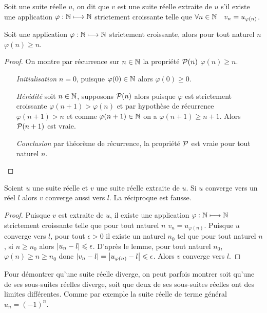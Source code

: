 \begin{defdef}
  Soit une suite réelle \(u\), on dit que \(v\) est une suite réelle extraite de \(u\) s'il existe une application \(\varphi:\N \longmapsto \N\) strictement croissante telle que \(\forall n\in \N \quad v_n = u_{\varphi(n)}\).
\end{defdef}
\begin{lemme}
  Soit une application \(\varphi:\N \longmapsto \N\) strictement croissante, alors pour tout naturel \(n\) \(\varphi(n) \geqslant n\).
\end{lemme}
\begin{proof}
  On montre par récurrence sur \(n \in \N\) la propriété \(\P(n)\) \(\varphi(n) \geqslant n\).
  \begin{itemize}
      \item[\emph{Initialisation}] \(n = 0\), puisque \(\varphi(0) \in \N\) alors \(\varphi(0) \geqslant 0\).
      \item[\emph{Hérédité}] soit \(n \in \N\), supposons \(\P(n)\) alors puisque \(\varphi\) est strictement croissante \(\varphi(n+1) > \varphi(n)\) et par hypothèse de récurrence \(\varphi(n+1) > n\) et comme \(\varphi(n+1) \in \N\) on a \(\varphi(n+1) \geqslant n+1\). Alors \(\P(n+1)\) est vraie.
      \item[\emph{Conclusion}] par théorème de récurrence, la propriété \(\P\) est vraie pour tout naturel \(n\).
  \end{itemize}
\end{proof}
\begin{prop}
  Soient \(u\) une suite réelle et \(v\) une suite réelle extraite de \(u\). Si \(u\) converge vers un réel \(l\) alors \(v\) converge aussi vers \(l\). La réciproque est fausse.
\end{prop}
\begin{proof}
  Puisque \(v\) est extraite de \(u\), il existe une application \(\varphi:\N \longmapsto \N\) strictement croissante telle que pour tout naturel \(n\) \(v_n = u_{\varphi(n)}\). Puisque \(u\) converge vers \(l\), pour tout \(\epsilon>0\) il existe un naturel \(n_0\) tel que pour tout naturel \(n\), si \(n \geqslant n_0\) alors \(\abs{u_n-l} \leqslant \epsilon\). D'après le lemme, pour tout naturel \(n_0\), \(\varphi(n) \geqslant n \geqslant n_0\) donc \(\abs{v_n-l} = \abs{u_{\varphi(n)}-l} \leqslant \epsilon\). Alors \(v\) converge vers \(l\).
\end{proof}
Pour démontrer qu'une suite réelle diverge, on peut parfois montrer soit qu'une de ses sous-suites réelles diverge, soit que deux de ses sous-suites réelles ont des limites différentes. Comme par exemple la suite réelle de terme général \(u_n = (-1)^n\).
